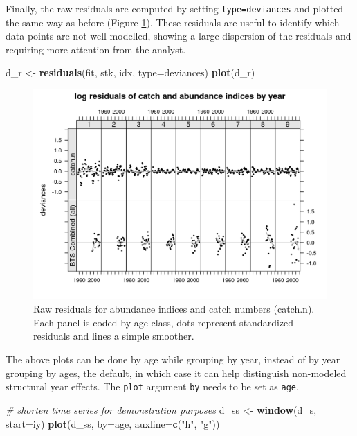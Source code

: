 \documentclass[
]{book}
\newenvironment{Shaded}{\begin{snugshade}}{\end{snugshade}}
\newcommand{\AttributeTok}[1]{\textcolor[rgb]{0.13,0.29,0.53}{#1}}
\newcommand{\CommentTok}[1]{\textcolor[rgb]{0.56,0.35,0.01}{\textit{#1}}}
\newcommand{\FunctionTok}[1]{\textcolor[rgb]{0.13,0.29,0.53}{\textbf{#1}}}
\newcommand{\NormalTok}[1]{#1}
\newcommand{\OtherTok}[1]{\textcolor[rgb]{0.56,0.35,0.01}{#1}}
\newcommand{\StringTok}[1]{\textcolor[rgb]{0.31,0.60,0.02}{#1}}
\begin{document}
Finally, the raw residuals are computed by setting \texttt{type=\textquotesingle{}deviances\textquotesingle{}} and plotted the same way as before (Figure \ref{fig:resr}). These residuals are useful to identify which data points are not well modelled, showing a large dispersion of the residuals and requiring more attention from the analyst.

\begin{Shaded}
\begin{Highlighting}[]
\NormalTok{d\_r }\OtherTok{\textless{}{-}} \FunctionTok{residuals}\NormalTok{(fit, stk, idx, }\AttributeTok{type=}\StringTok{\textquotesingle{}deviances\textquotesingle{}}\NormalTok{)}
\FunctionTok{plot}\NormalTok{(d\_r)}
\end{Highlighting}
\end{Shaded}

\begin{figure}
\centering
\includegraphics{_bookdown_files/_main_files/figure-html/resr-1.png}
\caption{\label{fig:resr}Raw residuals for abundance indices and catch numbers (catch.n). Each panel is coded by age class, dots represent standardized residuals and lines a simple smoother.}
\end{figure}

The above plots can be done by age while grouping by year, instead of by year grouping by ages, the default, in which case it can help distinguish non-modeled structural year effects. The \texttt{plot} argument \texttt{by} needs to be set as \texttt{age}.

\begin{Shaded}
\begin{Highlighting}[]
\CommentTok{\# shorten time series for demonstration purposes}
\NormalTok{d\_ss }\OtherTok{\textless{}{-}} \FunctionTok{window}\NormalTok{(d\_s, }\AttributeTok{start=}\NormalTok{iy)}
\FunctionTok{plot}\NormalTok{(d\_ss, }\AttributeTok{by=}\StringTok{\textquotesingle{}age\textquotesingle{}}\NormalTok{, }\AttributeTok{auxline=}\FunctionTok{c}\NormalTok{(}\StringTok{"h"}\NormalTok{, }\StringTok{"g"}\NormalTok{))}
\end{Highlighting}
\end{Shaded}
\end{document}
